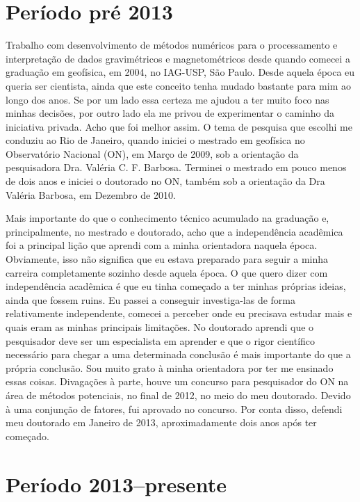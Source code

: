 \section*{Período pré 2013}


Trabalho com desenvolvimento de métodos numéricos para o processamento e
interpretação de dados gravimétricos e magnetométricos desde quando comecei
a graduação em geofísica, em 2004, no IAG-USP, São Paulo.
Desde aquela época eu queria ser cientista, ainda que este conceito tenha mudado 
bastante para mim ao longo dos anos. Se por um lado essa certeza me ajudou a 
ter muito foco nas minhas decisões, por outro lado ela me privou de experimentar
o caminho da iniciativa privada. Acho que foi melhor assim.
O tema de pesquisa que escolhi me conduziu ao Rio de Janeiro, quando iniciei 
o mestrado em geofísica no Observatório Nacional (ON), em Março de 2009, sob 
a orientação da pesquisadora Dra. Valéria C. F. Barbosa. 
Terminei o mestrado em pouco menos de dois anos e iniciei o doutorado no ON, 
também sob a orientação da Dra Valéria Barbosa, em Dezembro de 2010.


Mais importante do que o conhecimento técnico acumulado na graduação e, 
principalmente, no mestrado e doutorado, acho que a independência acadêmica 
foi a principal lição que aprendi com a minha orientadora naquela época.
Obviamente, isso não significa que eu estava preparado para seguir a minha 
carreira completamente sozinho desde aquela época. O que quero dizer com 
independência acadêmica é que eu tinha começado a ter minhas próprias ideias,
ainda que fossem ruins. Eu passei a conseguir investiga-las de forma 
relativamente independente, comecei a perceber onde eu precisava estudar 
mais e quais eram as minhas principais limitações.
No doutorado aprendi que o pesquisador deve ser um especialista em aprender
e que o rigor científico necessário para chegar a uma determinada conclusão é 
mais importante do que a própria conclusão.
Sou muito grato à minha orientadora por ter me ensinado essas coisas.
Divagações à parte, houve um concurso para pesquisador do ON na área de métodos 
potenciais, no final de 2012, no meio do meu doutorado. Devido à uma 
conjunção de fatores, fui aprovado no concurso. Por conta disso, defendi meu 
doutorado em Janeiro de 2013, aproximadamente dois anos após ter começado.


\section*{Período 2013--presente}



